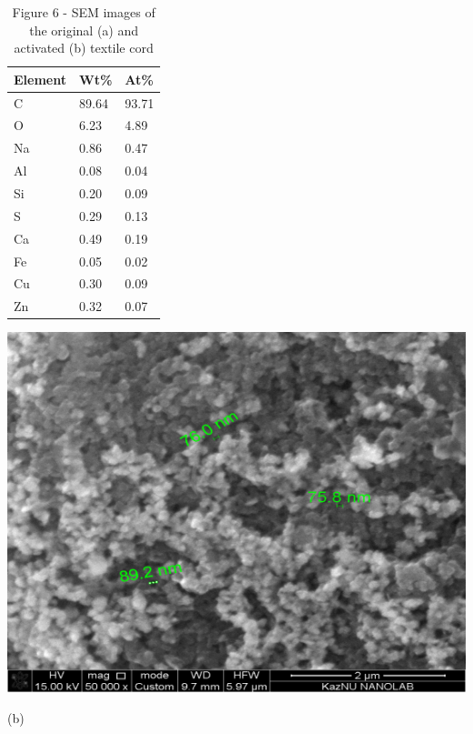 \begin{table}[H]
\centering
\begin{minipage}{0.45\textwidth}
\centering
\begin{tabular}{|l|l|l|}
\hline
Element & Wt\% & At\% \\ \hline
C & 89.64 & 93.71 \\ \hline
O & 6.23 & 4.89 \\ \hline
Na & 0.86 & 0.47 \\ \hline
Al & 0.08 & 0.04 \\ \hline
Si & 0.20 & 0.09 \\ \hline
S & 0.29 & 0.13 \\ \hline
Ca & 0.49 & 0.19 \\ \hline
Fe & 0.05 & 0.02 \\ \hline
Cu & 0.30 & 0.09 \\ \hline
Zn & 0.32 & 0.07 \\ \hline
\end{tabular}%
\end{minipage}\hfill
\begin{minipage}{0.45\textwidth}
\centering
\includegraphics[width=\textwidth]{assets/1010}
\end{minipage}
\caption*{(b)}
\caption*{Figure 6 - SEM images of the original (a) and activated (b) textile cord}
\end{table}


